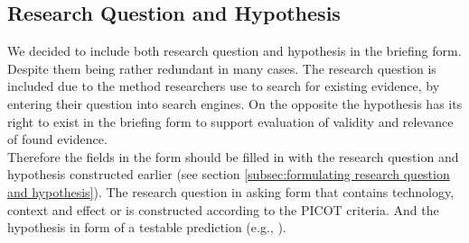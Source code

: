\subsection{Research Question and Hypothesis}
\label{subsec:research question and hypothesis}

We decided to include both research question and hypothesis in the briefing form. Despite them being rather redundant in many cases. The research question is included due to the method researchers use to search for existing evidence, by entering their question into search engines. On the opposite the hypothesis has its right to exist in the briefing form to support evaluation of validity and relevance of found evidence. \\
Therefore the fields in the form should be filled in with the research question and hypothesis constructed earlier (see section \ref{subsec:formulating research question and hypothesis}). The research question in asking form that contains technology, context and effect or is constructed according to the PICOT criteria. And the hypothesis in form of a testable prediction (e.g.,  \cite{Buddies2010}).